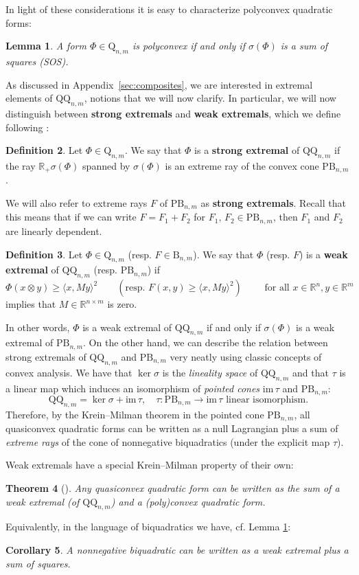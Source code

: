\documentclass[a4paper]{article}
\numberwithin{equation}{section}
\newcommand{\R}{\mathbb{R}}
\newtheorem{theorem}{Theorem}[section]
\newtheorem{cor}[theorem]{Corollary}
\newtheorem{lemma}[theorem]{Lemma}
\theoremstyle{definition}
\newtheorem{definition}[theorem]{Definition}
\theoremstyle{remark}
\newcommand{\qnm}{\mathrm{Q}_{n,m}}
\newcommand{\bnm}{\mathrm{B}_{n,m}}
\newcommand{\qqnm}{\mathrm{QQ}_{n,m}}
\newcommand{\pbnm}{\mathrm{PB}_{n,m}}
\begin{document}
In light of these considerations it is easy to characterize polyconvex quadratic forms:
\begin{lemma}\label{lem:char_polyconvex}
A form $\Phi\in\qnm$ is polyconvex if and only if $\sigma(\Phi)$ is a sum of squares (SOS).
\end{lemma}


As discussed in Appendix~\ref{sec:composites}, we are interested in extremal elements of {$\qqnm$}, notions that we will now clarify. In particular, we will now distinguish between \textbf{strong extremals}  and \textbf{weak extremals}, which we  define following \cite{HMcalcvar}:
\begin{definition}\label{def:SE}
Let $\Phi\in\qnm$. We say that $\Phi$ is a \textbf{strong extremal} of $\qqnm$ if the ray $\R_+ \sigma(\Phi)$ spanned by $\sigma(\Phi)$ is an extreme ray of the convex cone $\pbnm$. 
\end{definition}
We will also refer to extreme rays $F$ of $\pbnm$ as \textbf{strong extremals}. Recall that this means that if we can write $F=F_1+F_2$ for $F_1,\,F_2\in\pbnm$, then $F_1$ and $F_2$ are linearly dependent.
\begin{definition}\label{def:WE}
Let $\Phi\in\qnm$ (resp. $F\in\bnm$). We say that $\Phi$ (resp. $F$) is a \textbf{weak extremal} of $\qqnm$ (resp. $\pbnm$) if
$$
\Phi(x\otimes y)\geq \langle x,My\rangle^2\qquad(\text{resp. }F(x,y)\geq \langle x,My\rangle^2)\qquad\text{ for all }x\in\R^n,y\in\R^m
$$
implies that $M\in\R^{n\times m}$ is zero.
\end{definition}
In other words, $\Phi$ is a weak extremal of $\qqnm$ if and only if $\sigma(\Phi)$ is a weak extremal of $\pbnm$. On the other hand,  we can describe the relation between strong extremals of $\qqnm$ and $\pbnm$ very neatly using classic concepts of convex analysis. We have that $\ker \sigma $ is the \emph{lineality space} of $\qqnm$ and that $\tau$ is a linear map which induces an isomorphism of \emph{pointed cones} $\mathrm{im\,}\tau$ and $\pbnm$:
$$
\qqnm=\ker\sigma+\mathrm{im\,}\tau,\quad\tau\colon\pbnm\rightarrow\mathrm{im\,}\tau\text{ linear isomorphism}.
$$
Therefore, by the Krein--Milman theorem in the pointed cone $\pbnm$, all quasiconvex quadratic forms can be written as a null Lagrangian plus a sum of \emph{extreme rays} of the cone of nonnegative biquadratics (under the explicit map $\tau$). 

Weak extremals have a special Krein--Milman property of their own:
\begin{theorem}[{\cite[Sec. 6]{MiltonKM}}]
Any quasiconvex quadratic form can be written as the sum of a weak extremal (of $\qqnm$) and a (poly)convex quadratic form.
\end{theorem}
Equivalently, in the language of biquadratics we have, cf. Lemma \ref{lem:char_polyconvex}:
\begin{cor}
A nonnegative biquadratic can be written as a weak extremal  plus a sum of squares.
\end{cor}
\end{document}
